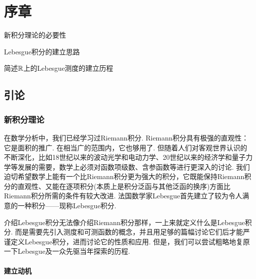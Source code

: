 \chapter{序章}

\begin{introduction}
    \item 新积分理论的必要性
    \item Lebesgue积分的建立思路
    \item 简述$\mathbb{R}$上的Lebesgue测度的建立历程
\end{introduction}


\section{引论}

\subsection{新积分理论}

在数学分析中，我们已经学习过Riemann积分. Riemann积分具有极强的直观性：它是面积的推广. 在相当广的范围内，它也够用了. 但随着人们对客观世界认识的不断深化，比如18世纪以来的波动光学和电动力学、20世纪以来的经济学和量子力学等发展的需要，数学上必须对函数项级数、含参函数等进行更深入的讨论. 我们迫切希望数学上能有一个比Riemann积分更为强大的积分，它既能保持Riemann积分的直观性、又能在逐项积分(本质上是积分泛函与其他泛函的换序)方面比Riemann积分所需的条件有较大改进. 法国数学家Lebesgue首先建立了较为令人满意的一种积分——现称Lebesgue积分.

介绍Lebesgue积分无法像介绍Riemann积分那样，一上来就定义什么是Lebesgue积分. 而是需要先引入测度和可测函数的概念，并且用足够的篇幅讨论它们后才能严谨定义Lebesgue积分，进而讨论它的性质和应用. 但是，我们可以尝试粗略地复原一下Lebesgue及一众先驱当年探索的历程.

\subsubsection{建立动机}

